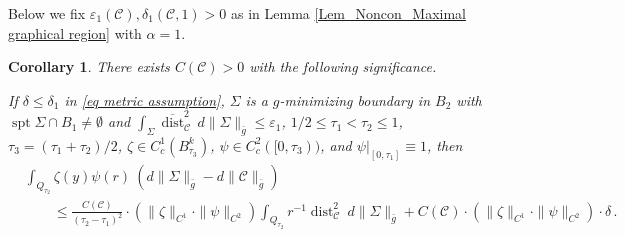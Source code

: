 \documentclass[11pt, letterpaper, reqno]{amsart}
\numberwithin{equation}{section}
\newtheorem{Cor}[Def]{Corollary}
\theoremstyle{remark}
\newcommand{\cC}{\mathcal{C}}
\newcommand{\supp}{\operatorname{spt}}
\newcommand{\dist}{\operatorname{dist}}
\newcommand{\Sdist}{\overline{\dist}}
\newcommand{\eps}{\varepsilon}
\begin{document}
Below we fix $\eps_1(\cC),\delta_1(\cC,1) > 0$ as in Lemma \ref{Lem_Noncon_Maximal graphical region} with $\alpha=1$.

   \begin{Cor} \label{Cor_Noncon_Vol diff est btwn M and C}
      There exists $C(\cC) > 0$ with the following significance.
     
      If $\delta \leq \delta_1$ in \eqref{eq metric assumption}, $\Sigma$ is a $g$-minimizing boundary in $B_2$ with $\supp \Sigma \cap B_{1} \neq \emptyset$ and $\int_{\Sigma}\Sdist_\cC^2\, d\|\Sigma\|_{\bar g} \leq \eps_1$, $1/2 \leq \tau_1<\tau_2 \leq 1$, $\tau_3 = (\tau_1+\tau_2)/2$, $\zeta\in C_c^1(B_{\tau_3}^k)$, $\psi\in C_c^2([0, \tau_3))$, and $\psi|_{[0,\tau_1]} \equiv 1$, then
     \begin{align*}
       & \int_{Q_{\tau_2}} \zeta(y)\psi(r)\ (d\|\Sigma\|_{\bar g} - d\|\cC\|_{\bar g}) \\ 
       & \qquad \leq \frac{C(\cC)}{(\tau_2-\tau_1)^2}\cdot (\|\zeta\|_{C^1}\cdot\|\psi\|_{C^2})\int_{Q_{\tau_2}} r^{-1}\dist_\cC^2\ d\|\Sigma\|_{\bar g} + C(\cC) \cdot (\|\zeta\|_{C^1}\cdot\|\psi\|_{C^2}) \cdot\delta \,.
     \end{align*}
   \end{Cor}
\end{document}
